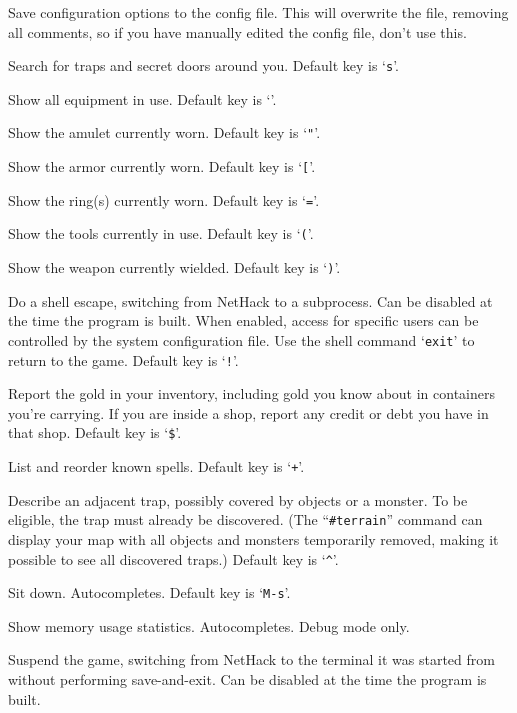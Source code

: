 Save configuration options to the config file.
This will overwrite the file, removing all comments, so if you have
manually edited the config file, don't use this.
\item[\tb{\#search}]
Search for traps and secret doors around you. Default key is `{\tt s}'.
\item[\tb{\#seeall}]
Show all equipment in use. Default key is `{\tt *}'.
\item[\tb{\#seeamulet}]
Show the amulet currently worn. Default key is `{\tt "}'.
\item[\tb{\#seearmor}]
Show the armor currently worn. Default key is `{\tt [}'.
\item[\tb{\#seerings}]
Show the ring(s) currently worn. Default key is `{\tt =}'.
\item[\tb{\#seetools}]
Show the tools currently in use. Default key is `{\tt (}'.
\item[\tb{\#seeweapon}]
Show the weapon currently wielded. Default key is `{\tt )}'.
\item[\tb{\#shell}]
Do a shell escape, switching from NetHack to a subprocess.
Can be disabled at the time the program is built.
When enabled, access for specific users can be controlled by the system
configuration file.
Use the shell command `{\tt exit}' to return to the game.
Default key is `{\tt !}'.
\item[\tb{\#showgold}]
Report the gold in your inventory, including gold you know about in
containers you're carrying.  If you are inside a shop, report any credit
or debt you have in that shop.
Default key is `{\tt \$}'.
\item[\tb{\#showspells}]
List and reorder known spells.
Default key is `{\tt +}'.
\item[\tb{\#showtrap}]
Describe an adjacent trap, possibly covered by objects or a monster.
To be eligible, the trap must already be discovered.
(The ``{\tt \#terrain}'' command can display your map with all objects and
monsters temporarily removed, making it possible to see all discovered
traps.)
Default key is `{\tt \^{}}'.
\item[\tb{\#sit}]
Sit down. Autocompletes. Default key is `{\tt M-s}'.
\item[\tb{\#stats}]
Show memory usage statistics.
Autocompletes.
Debug mode only.
\item[\tb{\#suspend}]
Suspend the game, switching from NetHack to the terminal it was started
from without performing save-and-exit.
Can be disabled at the time the program is built.
